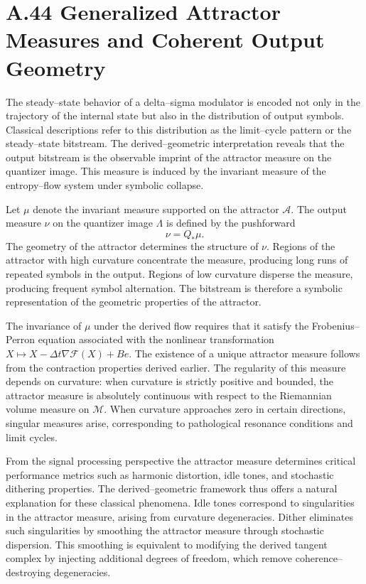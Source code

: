 \section{A.44 Generalized Attractor Measures and Coherent Output Geometry}

The steady–state behavior of a delta–sigma modulator is encoded not only in the trajectory of the internal state but also in the distribution of output symbols. Classical descriptions refer to this distribution as the limit–cycle pattern or the steady–state bitstream. The derived–geometric interpretation reveals that the output bitstream is the observable imprint of the attractor measure on the quantizer image. This measure is induced by the invariant measure of the entropy–flow system under symbolic collapse.

Let \(\mu\) denote the invariant measure supported on the attractor \(\mathcal{A}\). The output measure \(\nu\) on the quantizer image \(\Lambda\) is defined by the pushforward
\[
\nu = Q_\ast \mu.
\]
The geometry of the attractor determines the structure of \(\nu\). Regions of the attractor with high curvature concentrate the measure, producing long runs of repeated symbols in the output. Regions of low curvature disperse the measure, producing frequent symbol alternation. The bitstream is therefore a symbolic representation of the geometric properties of the attractor.

The invariance of \(\mu\) under the derived flow requires that it satisfy the Frobenius–Perron equation associated with the nonlinear transformation \(X \mapsto X - \Delta t \nabla \mathcal{F}(X) + B e\). The existence of a unique attractor measure follows from the contraction properties derived earlier. The regularity of this measure depends on curvature: when curvature is strictly positive and bounded, the attractor measure is absolutely continuous with respect to the Riemannian volume measure on \(\mathcal{M}\). When curvature approaches zero in certain directions, singular measures arise, corresponding to pathological resonance conditions and limit cycles.

From the signal processing perspective the attractor measure determines critical performance metrics such as harmonic distortion, idle tones, and stochastic dithering properties. The derived–geometric framework thus offers a natural explanation for these classical phenomena. Idle tones correspond to singularities in the attractor measure, arising from curvature degeneracies. Dither eliminates such singularities by smoothing the attractor measure through stochastic dispersion. This smoothing is equivalent to modifying the derived tangent complex by injecting additional degrees of freedom, which remove coherence–destroying degeneracies.

